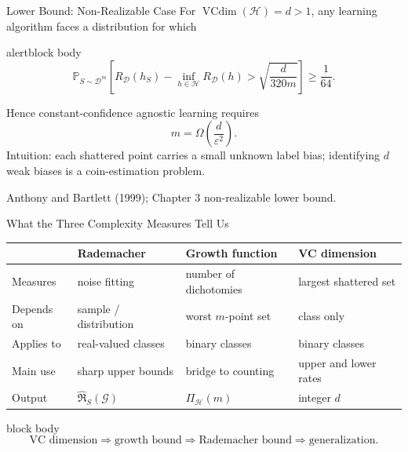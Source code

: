 \documentclass[aspectratio=169,10pt]{beamer}
\newcommand{\D}{\mathcal{D}}
\newcommand{\Hc}{\mathcal{H}}
\newcommand{\Gc}{\mathcal{G}}
\newcommand{\RadS}{\widehat{\mathfrak{R}}_S}
\newcommand{\PiH}{\Pi_{\Hc}}
\newcommand{\vcdim}{\operatorname{VCdim}}
\newcommand{\eps}{\varepsilon}
\newcommand{\Prb}{\mathbb{P}}
\newcommand{\SourceNote}[1]{%
  \vfill
  \begin{flushright}
    {\scriptsize\color{midgray}#1}
  \end{flushright}
}
\newcommand{\KeyBox}[1]{%
  \begin{beamercolorbox}[rounded=true,sep=0.22cm,wd=\linewidth]{block body}
    #1
  \end{beamercolorbox}%
}
\begin{document}
\begin{frame}[t]{Lower Bound: Non-Realizable Case}
  \vspace{0.01cm}
  For $\vcdim(\Hc)=d>1$, any learning algorithm faces a distribution for which
  \begin{beamercolorbox}[rounded=true,sep=0.18cm,wd=\linewidth]{alertblock body}
    \[
      \boxed{
      \Prb_{S\sim\D^m}\!\left[
        R_\D(h_S)-\inf_{h\in\Hc}R_\D(h)
        >\sqrt{\frac{d}{320m}}
      \right]\ge\frac{1}{64}.}
    \]
  \end{beamercolorbox}
  Hence constant-confidence agnostic learning requires
  \[
    \boxed{m=\Omega\!\left(\frac{d}{\eps^2}\right).}
  \]
  \vspace{0.04cm}
  Intuition: each shattered point carries a small unknown label bias; identifying $d$ weak biases is a coin-estimation problem.
  \SourceNote{Anthony and Bartlett (1999); Chapter 3 non-realizable lower bound.}
\end{frame}

\begin{frame}[t]{What the Three Complexity Measures Tell Us}
  \vspace{0.01cm}
  {\scriptsize
  \renewcommand{\arraystretch}{1.12}
  \begin{center}
  \begin{tabular}{p{2.35cm}p{2.95cm}p{3.05cm}p{3.05cm}}
    \toprule
    & \textbf{Rademacher} & \textbf{Growth function} & \textbf{VC dimension}\\
    \midrule
    Measures & noise fitting & number of dichotomies & largest shattered set\\
    Depends on & sample / distribution & worst $m$-point set & class only\\
    Applies to & real-valued classes & binary classes & binary classes\\
    Main use & sharp upper bounds & bridge to counting & upper and lower rates\\
    Output & $\RadS(\Gc)$ & $\PiH(m)$ & integer $d$\\
    \bottomrule
  \end{tabular}
  \end{center}}
  \vspace{0.06cm}
  \KeyBox{\small 
  \[
    \text{VC dimension}\Rightarrow\text{growth bound}\Rightarrow\text{Rademacher bound}\Rightarrow\text{generalization}.
  \]
  }
\end{frame}
\end{document}
